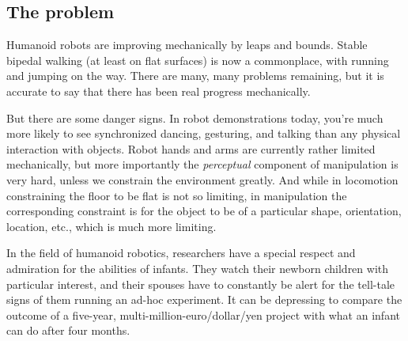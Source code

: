 



\subsection{The problem}

Humanoid robots are improving mechanically by leaps and bounds.
Stable bipedal walking (at least on flat surfaces) is now a
commonplace, with running and jumping on the way.  There are
many, many problems remaining, but it is accurate to say that
there has been real progress mechanically.

But there are some danger signs.  In robot demonstrations today,
you're much more likely to see synchronized dancing, gesturing, and
talking than any physical interaction with objects.  Robot hands and
arms are currently rather limited mechanically, but more importantly
the {\em perceptual} component of manipulation is very hard, unless we
constrain the environment greatly.  And while in locomotion
constraining the floor to be flat is not so limiting, in manipulation
the corresponding constraint is for the object to be of a particular
shape, orientation, location, etc., which is much more limiting.

In the field of humanoid robotics, researchers have a special respect
and admiration for the abilities of infants.  They watch their newborn
children with particular interest, and their spouses have to
constantly be alert for the tell-tale signs of them running an ad-hoc
experiment.  It can be depressing to compare the outcome of a 
five-year, multi-million-euro/dollar/yen project with what an
infant can do after four months.




